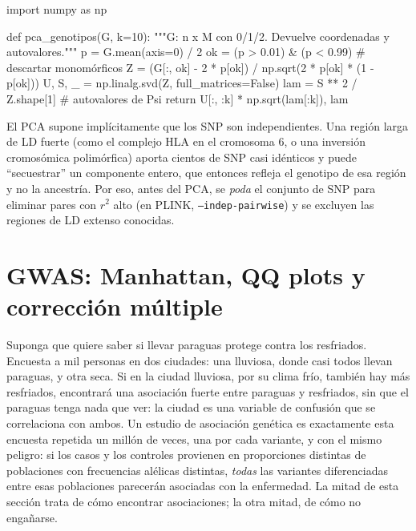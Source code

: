 \begin{codigo}
import numpy as np

def pca_genotipos(G, k=10):
    """G: n x M con 0/1/2. Devuelve coordenadas y autovalores."""
    p = G.mean(axis=0) / 2
    ok = (p > 0.01) & (p < 0.99)          # descartar monomórficos
    Z = (G[:, ok] - 2 * p[ok]) / np.sqrt(2 * p[ok] * (1 - p[ok]))
    U, S, _ = np.linalg.svd(Z, full_matrices=False)
    lam = S ** 2 / Z.shape[1]                    # autovalores de Psi
    return U[:, :k] * np.sqrt(lam[:k]), lam
\end{codigo}

\begin{cuidado}
El PCA supone implícitamente que los SNP son independientes. Una región larga de LD fuerte (como el complejo HLA en el cromosoma 6, o una inversión cromosómica polimórfica) aporta cientos de SNP casi idénticos y puede ``secuestrar'' un componente entero, que entonces refleja el genotipo de esa región y no la ancestría. Por eso, antes del PCA, se \emph{poda} el conjunto de SNP para eliminar pares con $r^2$ alto (en PLINK, \texttt{--indep-pairwise}) y se excluyen las regiones de LD extenso conocidas.
\end{cuidado}

\section{GWAS: Manhattan, QQ plots y corrección múltiple}\label{sec:10-gwas}

\begin{intuicion}
Suponga que quiere saber si llevar paraguas protege contra los resfriados. Encuesta a mil personas en dos ciudades: una lluviosa, donde casi todos llevan paraguas, y otra seca. Si en la ciudad lluviosa, por su clima frío, también hay más resfriados, encontrará una asociación fuerte entre paraguas y resfriados, sin que el paraguas tenga nada que ver: la ciudad es una variable de confusión que se correlaciona con ambos. Un estudio de asociación genética es exactamente esta encuesta repetida un millón de veces, una por cada variante, y con el mismo peligro: si los casos y los controles provienen en proporciones distintas de poblaciones con frecuencias alélicas distintas, \emph{todas} las variantes diferenciadas entre esas poblaciones parecerán asociadas con la enfermedad. La mitad de esta sección trata de cómo encontrar asociaciones; la otra mitad, de cómo no engañarse.
\end{intuicion}

